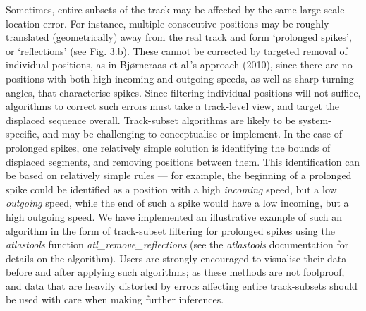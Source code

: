 \begin{refsection}[sorting=nyt]

    Sometimes, entire subsets of the track may be affected by the same large-scale location error.
    For instance, multiple consecutive positions may be roughly translated (geometrically) away from the real track and form `prolonged spikes', or `reflections' (see Fig. 3.b).
    These cannot be corrected by targeted removal of individual positions, as in Bjørneraas et al.'s approach (2010), since there are no positions with both high incoming and outgoing speeds, as well as sharp turning angles, that characterise spikes.
    Since filtering individual positions will not suffice, algorithms to correct such errors must take a track-level view, and target the displaced sequence overall.
    Track-subset algorithms are likely to be system-specific, and may be challenging to conceptualise or implement.
    In the case of prolonged spikes, one relatively simple solution is identifying the bounds of displaced segments, and removing positions between them.
    This identification can be based on relatively simple rules --- for example, the beginning of a prolonged spike could be identified as a position with a high \textit{incoming} speed, but a low \textit{outgoing} speed, while the end of such a spike would have a low incoming, but a high outgoing speed.
    We have implemented an illustrative example of such an algorithm in the form of track-subset filtering for prolonged spikes using the \textit{atlastools} function \textit{atl\_remove\_reflections} (see the \textit{atlastools} documentation for details on the algorithm).
    Users are strongly encouraged to visualise their data before and after applying such algorithms; as these methods are not foolproof, and data that are heavily distorted by errors affecting entire track-subsets should be used with care when making further inferences.


\end{refsection}
